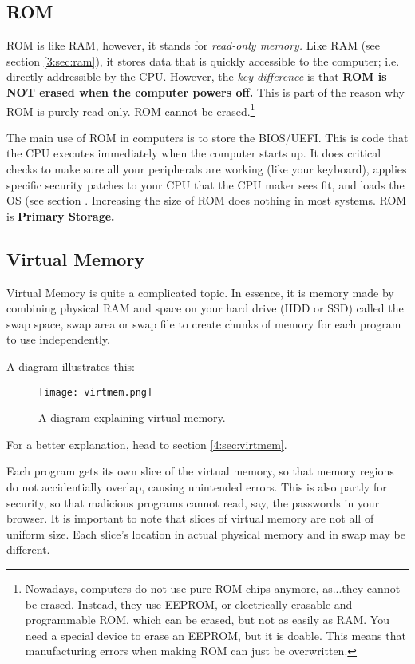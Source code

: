 \documentclass[../main.tex]{subfiles}
\begin{document}
\subsection{ROM}

ROM is like RAM, however, it stands for \emph{read-only memory.} Like RAM (see section \ref{3:sec:ram}), it stores data that is quickly accessible to the computer; i.e. directly addressible by the CPU. However, the \emph{key difference} is that \textbf{ROM is NOT erased when the computer powers off.} This is part of the reason why ROM is purely read-only. ROM cannot be erased.\footnote{Nowadays, computers do not use pure ROM chips anymore, as...they cannot be erased. Instead, they use EEPROM, or electrically-erasable and programmable ROM, which can be erased, but not as easily as RAM. You need a special device to erase an EEPROM, but it is doable. This means that manufacturing errors when making ROM can just be overwritten.}

The main use of ROM in computers is to store the BIOS/UEFI. This is code that the CPU executes immediately when the computer starts up. It does critical checks to make sure all your peripherals are working (like your keyboard), applies specific security patches to your CPU that the CPU maker sees fit, and loads the OS (see section \label{4:sec:the_os_and_kernel}. Increasing the size of ROM does nothing in most systems. ROM is \textbf{Primary Storage.}

\subsection{Virtual Memory}
\label{3:sec:virtmem}

Virtual Memory is quite a complicated topic. In essence, it is memory made by combining physical RAM and space on your hard drive (HDD or SSD) called the swap space, swap area or swap file to create chunks of memory for each program to use independently.

A diagram illustrates this:

\begin{figure}[H]
    \centering
    \texttt{[image: virtmem.png]}
    \caption{A diagram explaining virtual memory.}
    \label{fig:virtmem}
\end{figure}

For a better explanation, head to section \ref{4:sec:virtmem}.

Each program gets its own slice of the virtual memory, so that memory regions do not accidentially overlap, causing unintended errors. This is also partly for security, so that malicious programs cannot read, say, the passwords in your browser. It is important to note that slices of virtual memory are not all of uniform size. Each slice's location in actual physical memory and in swap may be different.
\end{document}
